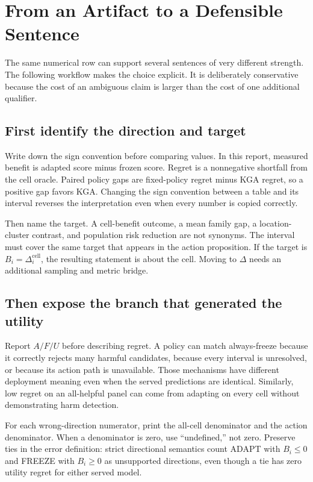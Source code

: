 \section{From an Artifact to a Defensible Sentence}
\label{fr:sec-interpretation-workflow}

The same numerical row can support several sentences of very different strength.  The following
workflow makes the choice explicit.  It is deliberately conservative because the cost of an
ambiguous claim is larger than the cost of one additional qualifier.

\subsection{First identify the direction and target}
\label{fr:sec-interpret-target}

Write down the sign convention before comparing values.  In this report, measured benefit is
adapted score minus frozen score.  Regret is a nonnegative shortfall from the cell oracle.  Paired
policy gaps are fixed-policy regret minus KGA regret, so a positive gap favors KGA.  Changing the
sign convention between a table and its interval reverses the interpretation even when every
number is copied correctly.

Then name the target.  A cell-benefit outcome, a mean family gap, a location-cluster contrast, and
population risk reduction are not synonyms.  The interval must cover the same target that appears
in the action proposition.  If the target is $B_i=\Delta_i^{\mathrm{cell}}$, the resulting statement
is about the cell.  Moving to $\Delta$ needs an additional sampling and metric bridge.

\subsection{Then expose the branch that generated the utility}
\label{fr:sec-interpret-exposure}

Report $A/F/U$ before describing regret.  A policy can match always-freeze because it correctly
rejects many harmful candidates, because every interval is unresolved, or because its action path
is unavailable.  Those mechanisms have different deployment meaning even when the served
predictions are identical.  Similarly, low regret on an all-helpful panel can come from adapting on
every cell without demonstrating harm detection.

For each wrong-direction numerator, print the all-cell denominator and the action denominator.
When a denominator is zero, use ``undefined,'' not zero.  Preserve ties in the error definition:
strict directional semantics count ADAPT with $B_i\le0$ and FREEZE with $B_i\ge0$ as unsupported
directions, even though a tie has zero utility regret for either served model.

